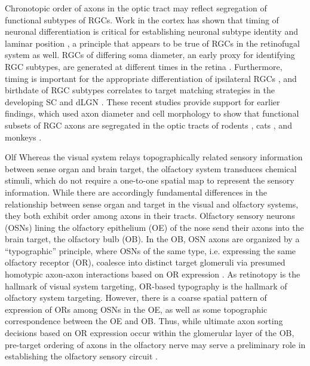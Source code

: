 \label{sec:Typography}
Chronotopic order of axons in the optic tract may reflect segregation of functional subtypes of RGCs.
Work in the cortex has shown that timing of neuronal differentiation is critical for establishing neuronal subtype identity and laminar position \cite{molyneaux2007neuronal}, a principle that appears to be true of RGCs in the retinofugal system as well.
RGCs of differing soma diameter, an early proxy for identifying RGC subtypes, are generated at different times in the retina \cite{rapaport1995spatiotemporal,reese1994birthdates}.
Furthermore, timing is important for the appropriate differentiation of ipsilateral RGCs \cite{bhansali2014delayed}, and birthdate of RGC subtypes correlates to target matching strategies in the developing SC and dLGN \cite{osterhout2014birthdate}.
These recent studies provide support for earlier findings, which used axon diameter and cell morphology to show that functional subsets of RGC axons are segregated in the optic tracts of rodents \cite{reese1987distributionrat}, cats \cite{guillery1982arrangement,torrealba1982studies}, and monkeys \cite{reese1990fibre}.


Olf
Whereas the visual system relays topographically related sensory information between sense organ and brain target, the olfactory system transduces chemical stimuli, which do not require a one-to-one spatial map to represent the sensory information.
While there are accordingly fundamental differences in the relationship between sense organ and target in the visual and olfactory systems, they both exhibit order among axons in their tracts. 
Olfactory sensory neurons (OSNs) lining the olfactory epithelium (OE) of the nose send their axons into the brain target, the olfactory bulb (OB).
In the OB, OSN axons are organized by a “typographic” principle, where OSNs of the same type, i.e. expressing the same olfactory receptor (OR), coalesce into distinct target glomeruli via presumed homotypic axon-axon interactions based on OR expression \cite{feinstein2004contextual}.
As retinotopy is the hallmark of visual system targeting, OR-based typography is the hallmark of olfactory system targeting.
However, there is a coarse spatial pattern of expression of ORs among OSNs in the OE, as well as some topographic correspondence between the OE and OB.
Thus, while ultimate axon sorting decisions based on OR expression occur within the glomerular layer of the OB, pre-target ordering of axons in the olfactory nerve may serve a preliminary role in establishing the olfactory sensory circuit \cite{miller2010axon}.

